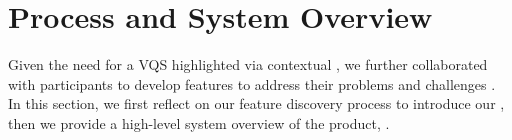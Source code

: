  \section{ Process and System Overview\label{sec:pd_findings}}
 Given the need for a VQS highlighted via contextual , we further collaborated with participants to develop features to address their problems and challenges . In this section, we first reflect on our feature discovery process to introduce our , then we provide a high-level system overview of the  product, \zvpp.
